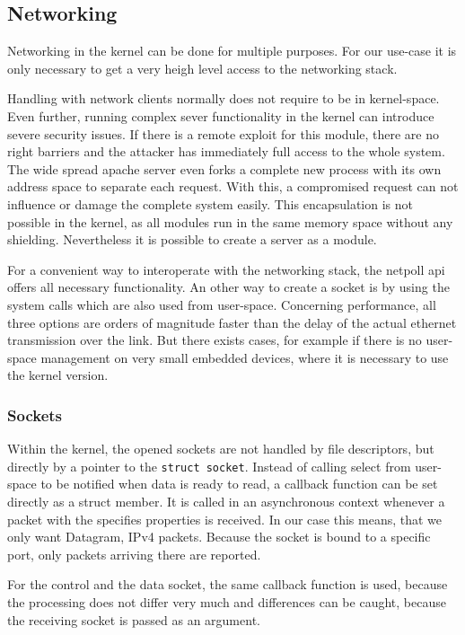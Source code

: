 \documentclass[paper=a4,fontsize=11pt,twocolumn,pagesize,bibtotoc]{scrartcl}
\begin{document}
	\subsection{Networking}
	
	Networking in the kernel can be done for multiple purposes. For our use-case it is only necessary to get a very heigh level access to the networking stack. 
	
	Handling with network clients normally does not require to be in kernel-space. Even further, running complex sever functionality in the kernel can introduce severe security issues. If there is a remote exploit for this module, there are no right barriers and the attacker has immediately full access to the whole system. The wide spread apache server even forks a complete new process with its own address space to separate each request. With this, a compromised request can not influence or damage the complete system easily.
	This encapsulation is not possible in the kernel, as all modules run in the same memory space without any shielding. Nevertheless it is possible to create a server as a module.
	
	For a convenient way to interoperate with the networking stack, the netpoll api offers all necessary functionality. An other way to create a socket is by using the system calls which are also used from user-space. Concerning performance, all three options are orders of magnitude faster than the delay of the actual ethernet transmission over the link. But there exists cases, for example if there is no user-space management on very small embedded devices, where it is necessary to use the kernel version.
	
	\subsubsection{Sockets}
	
	Within the kernel, the opened sockets are not handled by file descriptors, but directly by a pointer to the \texttt{struct socket}. Instead of calling select from user-space to be notified when data is ready to read, a callback function can be set directly as a struct member. It is called in an asynchronous context whenever a packet with the specifies properties is received. In our case this means, that we only want Datagram, IPv4 packets. Because the socket is bound to a specific port, only packets arriving there are reported.
	
	For the control and the data socket, the same callback function is used, because the processing does not differ very much and differences can be caught, because the receiving socket is passed as an argument.
	
\end{document}
